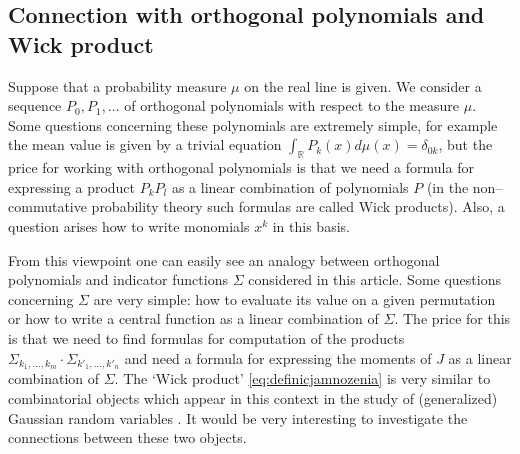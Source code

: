 \documentclass[12pt,dvips]{amsart}
\numberwithin{equation}{section} \numberwithin{figure}{section}
\theoremstyle{plain}
\theoremstyle{definition}
\theoremstyle{remark}
\newcommand{\R}{{\mathbb{R}}}
\begin{document}
\subsection[Connection with orthogonal polynomials]{Connection
with orthogonal polynomials and Wick product} Suppose that a
probability measure $\mu$ on the real line is given. We consider a
sequence $P_0,P_1,\dots$ of orthogonal polynomials with respect to
the measure $\mu$. Some questions concerning these polynomials are
extremely simple, for example the mean value is given by a trivial
equation $\int_\R P_k(x) d\mu(x)= \delta_{0k}$, but the price for
working with orthogonal polynomials is that we need a formula for
expressing a product $P_k P_l$ as a linear combination of
polynomials $P$ (in the non--commutative probability theory such
formulas are called Wick products). Also, a question arises how to
write monomials $x^k$ in this basis.

From this viewpoint one can easily see an analogy between orthogonal
polynomials and indicator functions $\Sigma$ considered in this
article. Some questions concerning $\Sigma$ are very simple: how to
evaluate its value on a given permutation or how to write a central
function as a linear combination of $\Sigma$. The price for this is
that we need to find formulas for computation of the products
$\Sigma_{k_1,\dots,k_m} \cdot \Sigma_{k'_1,\dots,k'_n}$ and need a
formula for expressing the moments of $J$ as a linear combination of
$\Sigma$. The `Wick product' \eqref{eq:definicjamnozenia} is very
similar to combinatorial objects which appear in this context in the
study of (generalized) Gaussian random variables \cite{GutaPhd}. It
would be very interesting to investigate the connections between
these two objects.
\end{document}
